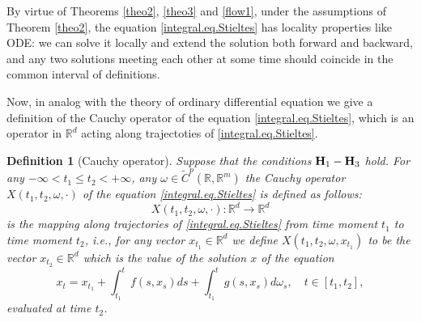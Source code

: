 \documentclass[10pt]{article}
\numberwithin{equation}{section} %
\newcommand{\R}{\ensuremath{\mathbb{R}}}
\newtheorem{definition}[theorem]{Definition}
\begin{document}
 \begin{remark}
 By virtue of Theorems \ref{theo2}, \ref{theo3} and \ref{flow1}, under the assumptions of Theorem \ref{theo2}, the equation \eqref{integral.eq.Stieltes}  has locality properties like ODE: we can solve it locally and extend the solution both forward and backward, and any two solutions meeting each other at some time should coincide in the common interval of definitions.
 \end{remark}

 Now, in analog with the theory of ordinary differential equation we give a definition of the Cauchy operator of the equation \eqref{integral.eq.Stieltes}, which is an operator in $\R^d$ acting along trajectoties of \eqref{integral.eq.Stieltes}. 
  
  \begin{definition}[Cauchy operator]\label{dfn.Cauchy}
Suppose that the conditions ${\textbf H}_1-{\textbf H}_3$ hold. 
 For any $-\infty< t_1\leq t_2<+\infty$, any $\omega\in \widetilde{C}^p(\R,\R^m)$ the {\em Cauchy operator} $X(t_1,t_2,\omega,\cdot)$ of the equation \eqref{integral.eq.Stieltes} is defined as follows:
 $$
 X(t_1,t_2,\omega,\cdot) : \R^d \rightarrow \R^d
 $$ 
 is the mapping along trajectories of \eqref{integral.eq.Stieltes}  from time moment $t_1$ to time moment $t_2$, i.e., for any vector $x_{t_1}\in \R^d$ we define $X(t_1,t_2,\omega,x_{t_1})$ to be the vector $x_{t_2}\in\R^d$ which is the value of the solution $x$ of the equation
  $$
   x_t = x_{t_1} + \int_{t_1}^t f(s,x_s) ds +  \int_{t_1}^t g(s,x_s) d\omega_s, \quad t\in [t_1,t_2],  
$$
 evaluated at time $t_2$.
 \end{definition}
 
\end{document}
